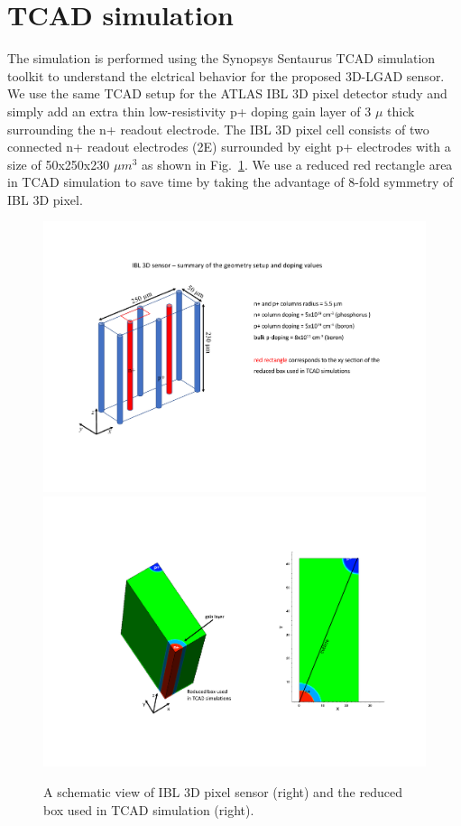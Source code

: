 \documentclass[aps,pt14,superscriptaddress,showpacs,floatfix,nofootinbib]{revtex4}
\begin{document}
\section{TCAD simulation}
The simulation is performed using the Synopsys Sentaurus TCAD simulation toolkit
to understand the elctrical behavior for the proposed 3D-LGAD sensor. 
We use the same TCAD setup for the ATLAS IBL 3D pixel detector study and
simply add an extra thin low-resistivity p+ doping gain layer of 3 $\mu$ thick
surrounding the n+ readout electrode. The IBL 3D pixel cell consists of two connected n+ 
readout electrodes (2E) surrounded by eight p+ electrodes with a size of 50x250x230 $\mu m^3$
as shown in Fig.~\ref{fig:ibl-3d}. We use a reduced red rectangle area in TCAD simulation to save time 
by taking the advantage of 8-fold symmetry of IBL 3D pixel. 

\begin{figure}[hbtp]
\begin{center}
\includegraphics[width=0.35\textheight,keepaspectratio]{figures/IBL3D_setup.pdf}
\includegraphics[page=1,width=0.35\textheight,keepaspectratio]{figures/IBL3D_250x50x230_withGainLayer_efield.pdf}
\caption{A schematic view of IBL 3D pixel sensor (right) and the reduced box used in TCAD simulation 
(right).\label{fig:ibl-3d}}
\end{center}
\end{figure}
\end{document}
